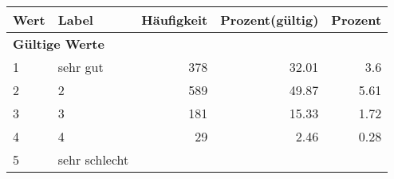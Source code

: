      \begin{longtable}{lXrrr}
     \toprule
     \textbf{Wert} & \textbf{Label} & \textbf{Häufigkeit} & \textbf{Prozent(gültig)} & \textbf{Prozent} \\
     \endhead
     \midrule
     \multicolumn{5}{l}{\textbf{Gültige Werte}}\\

     1 &
     \multicolumn{1}{X}{ sehr gut   } &


       \num{378} &
       \num[round-mode=places,round-precision=2]{32.01} &
         \num[round-mode=places,round-precision=2]{3.6} \\

     2 &
     \multicolumn{1}{X}{ 2   } &


       \num{589} &
       \num[round-mode=places,round-precision=2]{49.87} &
         \num[round-mode=places,round-precision=2]{5.61} \\

     3 &
     \multicolumn{1}{X}{ 3   } &


       \num{181} &
       \num[round-mode=places,round-precision=2]{15.33} &
         \num[round-mode=places,round-precision=2]{1.72} \\

     4 &
     \multicolumn{1}{X}{ 4   } &


       \num{29} &
       \num[round-mode=places,round-precision=2]{2.46} &
         \num[round-mode=places,round-precision=2]{0.28} \\

     5 &
     \multicolumn{1}{X}{ sehr schlecht   } &



\end{longtable}
